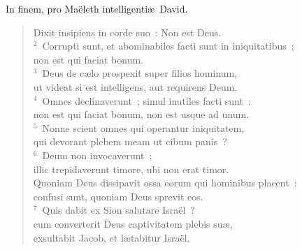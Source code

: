 \bchapter
\lettrine[lines=3,image=true,loversize=0.05,lraise=-0.03]{I}{}n finem, pro Ma\"eleth intelligenti\ae\ David. \begin{flushleft}\begin{verse}\vspace{6pt}Dixit insipiens in corde suo~: Non est Deus.\\
${}^{2}$~Corrupti sunt, et abominabiles facti sunt in iniquitatibus~;\\ non est qui faciat bonum.\\
${}^{3}$~Deus de c\ae lo prospexit super filios hominum,\\ ut videat si est intelligens, aut requirens Deum.\\
${}^{4}$~Omnes declinaverunt~; simul inutiles facti sunt~:\\ non est qui faciat bonum, non est usque ad unum.\\
${}^{5}$~Nonne scient omnes qui operantur iniquitatem,\\ qui devorant plebem meam ut cibum panis~?\\
${}^{6}$~Deum non invocaverunt~;\\ illic trepidaverunt timore, ubi non erat timor.\\ Quoniam Deus dissipavit ossa eorum qui hominibus placent~:\\ confusi sunt, quoniam Deus sprevit eos.\\
${}^{7}$~Quis dabit ex Sion salutare Isra\"el~?\\ cum converterit Deus captivitatem plebis su\ae ,\\ exsultabit Jacob, et l\ae tabitur Isra\"el.\end{verse}\end{flushleft}



